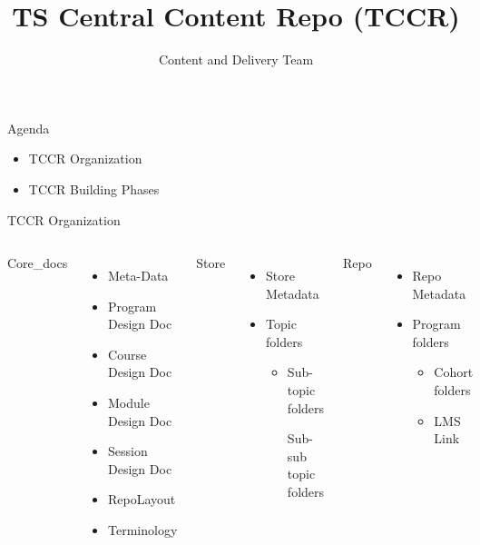 \documentclass[aspectratio=169,14pt,usenames,dvipsnames]{beamer}
\title[TS Central Content Repo (TCCR)]{TS Central Content Repo (TCCR)}
\begin{document}
{\1
\begin{frame} \vspace{35pt}
	\subtitle{Content and Delivery Team}
	\maketitle
\end{frame}
}


\begin{frame}{Agenda}
\begin{itemize}
\item TCCR Organization
\item TCCR Building Phases
\end{itemize}
\end{frame}
\begin{frame}{TCCR Organization}
\begin{columns}
\alert{Core\_docs}
\begin{itemize}
  \item Meta-Data
  \item Program Design Doc
  \item Course Design Doc
  \item Module Design Doc
  \item Session Design Doc
  \item RepoLayout
  \item Terminology
\end{itemize}

\alert{Store}
\begin{itemize}
\item Store Metadata
\item Topic folders
\begin{itemize}
\item Sub-topic folders
\begin{itemize}
\irem Sub-sub topic folders
\end{itemize}
\end{itemize}
\end{itemize}

\alert{Repo}
\begin{itemize}
\item Repo Metadata
\item Program folders
\begin{itemize}
\item Cohort folders
\item LMS Link
\end{itemize}
\end{itemize}
\end{columns}
\end{frame}
\end{document}
